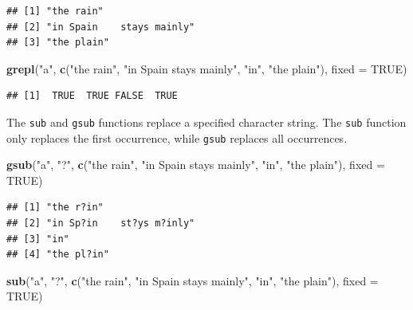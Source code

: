 \documentclass[
]{krantz}
\newenvironment{Shaded}{\begin{snugshade}}{\end{snugshade}}
\newcommand{\DataTypeTok}[1]{\textcolor[rgb]{0.13,0.29,0.53}{#1}}
\newcommand{\KeywordTok}[1]{\textcolor[rgb]{0.13,0.29,0.53}{\textbf{#1}}}
\newcommand{\NormalTok}[1]{#1}
\newcommand{\OtherTok}[1]{\textcolor[rgb]{0.56,0.35,0.01}{#1}}
\newcommand{\StringTok}[1]{\textcolor[rgb]{0.31,0.60,0.02}{#1}}
\begin{document}
\begin{verbatim}
## [1] "the rain"                
## [2] "in Spain    stays mainly"
## [3] "the plain"
\end{verbatim}

\begin{Shaded}
\begin{Highlighting}[]
\KeywordTok{grepl}\NormalTok{(}\StringTok{"a"}\NormalTok{, }\KeywordTok{c}\NormalTok{(}\StringTok{"the rain"}\NormalTok{, }\StringTok{"in Spain    stays mainly"}\NormalTok{, }\StringTok{"in"}\NormalTok{, }\StringTok{"the plain"}\NormalTok{), }
      \DataTypeTok{fixed =} \OtherTok{TRUE}\NormalTok{)}
\end{Highlighting}
\end{Shaded}

\begin{verbatim}
## [1]  TRUE  TRUE FALSE  TRUE
\end{verbatim}

The \texttt{sub} and \texttt{gsub} functions replace a specified character string. The \texttt{sub} function only replaces the first occurrence, while \texttt{gsub} replaces all occurrences.

\begin{Shaded}
\begin{Highlighting}[]
\KeywordTok{gsub}\NormalTok{(}\StringTok{"a"}\NormalTok{, }\StringTok{"?"}\NormalTok{, }\KeywordTok{c}\NormalTok{(}\StringTok{"the rain"}\NormalTok{, }\StringTok{"in Spain    stays mainly"}\NormalTok{, }\StringTok{"in"}\NormalTok{, }
                 \StringTok{"the plain"}\NormalTok{), }\DataTypeTok{fixed =} \OtherTok{TRUE}\NormalTok{)}
\end{Highlighting}
\end{Shaded}

\begin{verbatim}
## [1] "the r?in"                
## [2] "in Sp?in    st?ys m?inly"
## [3] "in"                      
## [4] "the pl?in"
\end{verbatim}

\begin{Shaded}
\begin{Highlighting}[]
\KeywordTok{sub}\NormalTok{(}\StringTok{"a"}\NormalTok{, }\StringTok{"?"}\NormalTok{, }\KeywordTok{c}\NormalTok{(}\StringTok{"the rain"}\NormalTok{, }\StringTok{"in Spain    stays mainly"}\NormalTok{, }\StringTok{"in"}\NormalTok{, }
                \StringTok{"the plain"}\NormalTok{), }\DataTypeTok{fixed =} \OtherTok{TRUE}\NormalTok{)}
\end{Highlighting}
\end{Shaded}
\end{document}
